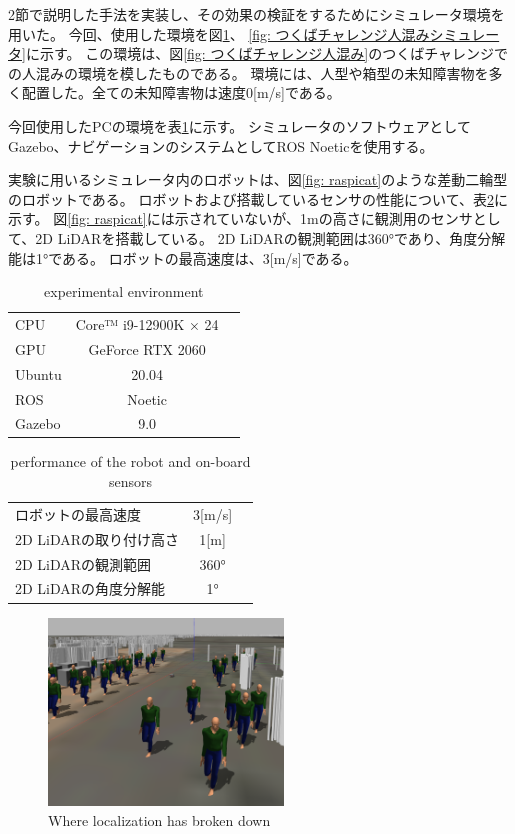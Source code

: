 \documentclass{jarticle}
\begin{document}
2節で説明した手法を実装し、その効果の検証をするためにシミュレータ環境を用いた。
今回、使用した環境を図\ref{fig: 人混みガゼボ}、
\ref{fig: つくばチャレンジ人混みシミュレータ}に示す。
この環境は、図\ref{fig: つくばチャレンジ人混み}のつくばチャレンジでの人混みの環境を模したものである。
環境には、人型や箱型の未知障害物を多く配置した。全ての未知障害物は速度0[m/s]である。

今回使用したPCの環境を表\ref{table: PCの環境}に示す。
シミュレータのソフトウェアとしてGazebo、ナビゲーションのシステムとしてROS Noeticを使用する。

実験に用いるシミュレータ内のロボットは、図\ref{fig: raspicat}のような差動二輪型のロボットである。
ロボットおよび搭載しているセンサの性能について、表\ref{table: ロボットおよび搭載しているセンサの性能}に示す。
図\ref{fig: raspicat}には示されていないが、1mの高さに観測用のセンサとして、2D LiDARを搭載している。
2D LiDARの観測範囲は360°であり、角度分解能は1°である。
ロボットの最高速度は、3[m/s]である。

\begin{table}[hbtp]
  \caption{experimental environment}
  \label{table: PCの環境}
  \centering
  \begin{tabular}{lcr}
    \hline
    CPU & Core™ i9-12900K × 24 \\
    GPU & GeForce RTX 2060 \\
    Ubuntu & 20.04 \\
    ROS  & Noetic \\
    Gazebo  &  9.0 \\
    \hline
  \end{tabular}
\end{table}

\begin{table}[hbtp]
  \caption{performance of the robot and on-board sensors}
  \label{table: ロボットおよび搭載しているセンサの性能}
  \centering
  \begin{tabular}{lcr}
    \hline
    ロボットの最高速度 & 3[m/s] \\
    2D LiDARの取り付け高さ & 1[m] \\
    2D LiDARの観測範囲 & 360° \\
    2D LiDARの角度分解能 & 1° \\
    \hline
  \end{tabular}
\end{table}

\begin{figure}[htbp]
  \centering
   \includegraphics[height=50mm]{fig/hitogomi_gazebo.png}
   \vspace*{-4mm}
   \caption{Where localization has broken down}
   \label{fig: 人混みガゼボ}
\end{figure}
\end{document}
